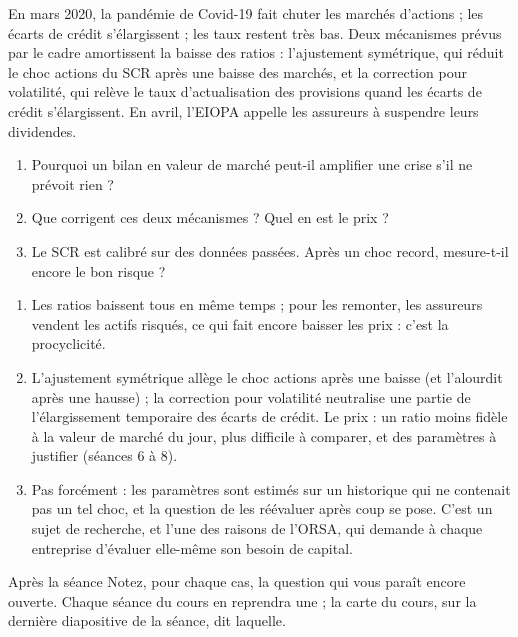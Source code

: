 \documentclass[11pt,a4paper]{article}
\begin{document}
\begin{exercice}
En mars 2020, la pandémie de Covid-19 fait chuter les marchés d'actions ; les écarts de crédit
s'élargissent ; les taux restent très bas. Deux mécanismes prévus par le cadre amortissent la baisse
des ratios : l'ajustement symétrique, qui réduit le choc actions du SCR après une baisse des
marchés, et la correction pour volatilité, qui relève le taux d'actualisation des provisions quand
les écarts de crédit s'élargissent. En avril, l'EIOPA appelle les assureurs à suspendre leurs
dividendes.
\begin{enumerate}[nosep]
  \item Pourquoi un bilan en valeur de marché peut-il amplifier une crise s'il ne prévoit rien ?
  \item Que corrigent ces deux mécanismes ? Quel en est le prix ?
  \item Le SCR est calibré sur des données passées. Après un choc record, mesure-t-il encore le bon risque ?
\end{enumerate}
\end{exercice}
\begin{corrige}
\begin{enumerate}[nosep]
  \item Les ratios baissent tous en même temps ; pour les remonter, les assureurs vendent les
        actifs risqués, ce qui fait encore baisser les prix : c'est la procyclicité.
  \item L'ajustement symétrique allège le choc actions après une baisse (et l'alourdit après une
        hausse) ; la correction pour volatilité neutralise une partie de l'élargissement
        temporaire des écarts de crédit. Le prix : un ratio moins fidèle à la valeur de marché
        du jour, plus difficile à comparer, et des paramètres à justifier (séances 6 à 8).
  \item Pas forcément : les paramètres sont estimés sur un historique qui ne contenait pas un tel
        choc, et la question de les réévaluer après coup se pose. C'est un sujet de recherche, et
        l'une des raisons de l'ORSA, qui demande à chaque entreprise d'évaluer elle-même son
        besoin de capital.
\end{enumerate}
\end{corrige}

\begin{generalisation}{Après la séance}
Notez, pour chaque cas, la question qui vous paraît encore ouverte. Chaque séance du cours en
reprendra une ; la carte du cours, sur la dernière diapositive de la séance, dit laquelle.
\end{generalisation}
\end{document}
